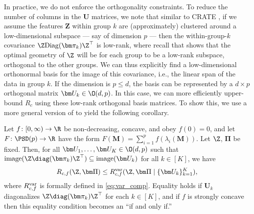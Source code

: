 \documentclass[../../book-main.tex]{subfiles}
\begin{document}
In practice, we do not enforce the orthogonality constraints. To reduce the number of columns in the $\bm U$ matrices, we note that similar to CRATE \citep{yu2023white}, if we assume the features $\bm Z$ within group \(k\) are (approximately) clustered around a low-dimensional subspace --- say of dimension \(p\) --- then the within-group-\(k\) covariance \(\Z\mathrm{Diag}(\bm \pi_{k})\Z^{\top}\) is low-rank, where recall that \cite{yu2020learning} shows that the optimal geometry of $\Z$ will be for each group to be a low-rank subspace, orthogonal to the other groups. We can thus explicitly find a low-dimensional orthonormal basis for the image of this covariance, i.e., the linear span of the data in group \(k\). If the dimension is $p \leq d$, the basis can be represented by a $d\times p$ orthogonal matrix $\bm U_k \in \O(d, p)$. In this case, we can more efficiently upper-bound \(R_{c}\) using these low-rank orthogonal basis matrices. To show this, we use a more general version of   to yield the following corollary.
\begin{corollary}\label{cor:var_concave_logdet}
    Let \(f \colon [0, \infty) \to \R\) be non-decreasing, concave, and obey \(f(0) = 0\), and let \(F \colon \PSD(p) \to \R\) have the form \(F(\bm M) = \sum_{i = 1}^{p}f(\lambda_{i}(\bm M))\). Let \(\Z\), \(\bm \Pi\) be fixed. Then, for all \(\bm U_{1}, \dots, \bm U_{K} \in \O(d, p)\) such that \(\mathrm{image}(\Z\diag(\bm \pi_{k})\Z^{\top}) \subseteq \mathrm{image}(\bm U_{k})\) for all \(k \in [K]\), we have
    \begin{equation}
        R_{c, f}(\Z, \bm\Pi) \leq R_{c, f}^{\rm var}(\Z, \bm\Pi \mid \{\bm U_{k}\}_{k = 1}^{K}), 
    \end{equation}
     where \(R_{c, f}^{\rm var}\) is formally defined in \eqref{eq:var_comp}. Equality holds if \(\bm U_{k}\) diagonalizes \(\Z\diag(\bm \pi_{k})\Z^{\top}\) for each \(k \in [K]\), and if \(f\) is strongly concave then this equality condition becomes an ``if and only if.''
\end{corollary}
\end{document}
